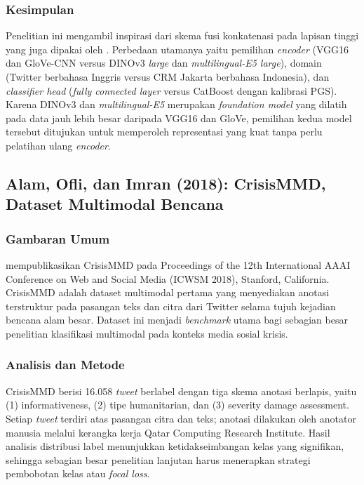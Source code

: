 \subsubsection{Kesimpulan}

Penelitian ini mengambil inspirasi dari skema fusi konkatenasi pada lapisan tinggi yang juga dipakai oleh \citet{ofliMultimodalDisaster2020}. Perbedaan utamanya yaitu pemilihan \textit{encoder} (VGG16 dan GloVe-CNN versus DINOv3 \textit{large} dan \textit{multilingual-E5 large}), domain (Twitter berbahasa Inggris versus CRM Jakarta berbahasa Indonesia), dan \textit{classifier head} (\textit{fully connected layer} versus CatBoost dengan kalibrasi PGS). Karena DINOv3 dan \textit{multilingual-E5} merupakan \textit{foundation model} yang dilatih pada data jauh lebih besar daripada VGG16 dan GloVe, pemilihan kedua model tersebut ditujukan untuk memperoleh representasi yang kuat tanpa perlu pelatihan ulang \textit{encoder}.

\subsection{Alam, Ofli, dan Imran (2018): CrisisMMD, Dataset Multimodal Bencana}

\subsubsection{Gambaran Umum}

\citet{alamCrisisMMD2018} mempublikasikan CrisisMMD pada Proceedings of the 12th International AAAI Conference on Web and Social Media (ICWSM 2018), Stanford, California. CrisisMMD adalah dataset multimodal pertama yang menyediakan anotasi terstruktur pada pasangan teks dan citra dari Twitter selama tujuh kejadian bencana alam besar. Dataset ini menjadi \textit{benchmark} utama bagi sebagian besar penelitian klasifikasi multimodal pada konteks media sosial krisis.

\subsubsection{Analisis dan Metode}

CrisisMMD berisi 16.058 \textit{tweet} berlabel dengan tiga skema anotasi berlapis, yaitu (1) informativeness, (2) tipe humanitarian, dan (3) severity damage assessment. Setiap \textit{tweet} terdiri atas pasangan citra dan teks; anotasi dilakukan oleh anotator manusia melalui kerangka kerja Qatar Computing Research Institute. Hasil analisis distribusi label menunjukkan ketidakseimbangan kelas yang signifikan, sehingga sebagian besar penelitian lanjutan harus menerapkan strategi pembobotan kelas atau \textit{focal loss}.

